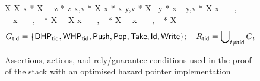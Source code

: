 \begin{figure*}[t]
\ee
\be
  X
  \leadsto
  X
\ee
\be
\Top \mapsto x * X
\ \leadsto \
\Top \mapsto z * z \mapsto x,v * X
\ee
\be
\Top \mapsto x * x \mapsto y,v * X
 \leadsto \ 
\Top \mapsto y * x \mapsto_\se y,v * X
\ee
\be
x \mapsto_\sm \_,\_ \ \mid\ 
x \mapsto_\se \_,\_ * X
\ \leadsto\ 
X
\tag{$\textsf{Take}$}
\ee
\be
x \mapsto_\se \_,\_ * X
\ \leadsto\ 
x \mapsto_\se \_,\_ * X
\ee
$$
G_{\sf tid} = \{\textsf{DHP}_{\sf tid},\textsf{WHP}_{\sf tid}, \textsf{Push}, \textsf{Pop}, \textsf{Take}, \textsf{Id}, \textsf{Write}\}; \quad
R_{\sf tid} = \bigcup\nolimits_{t \not= {\sf tid}} G_{t}
$$

\caption{\small Assertions,
actions, and rely/guarantee conditions used in
  the proof of the stack with an optimised hazard pointer implementation}  
\label{fig:DynHazardStackAssn}
\end{figure*}
%
%
%





